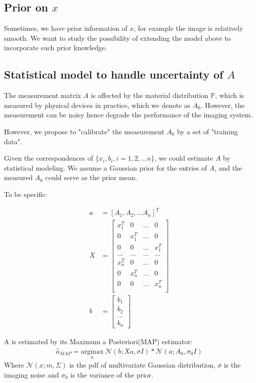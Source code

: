 \documentclass{article} %
\begin{document}
\subsection{Prior on $x$}
Sometimes, we have prior information of $x$, for example the image is relatively smooth. We want to study the possibility of extending the model above to incorporate such prior knowledge.

\subsection{Statistical model to handle uncertainty of $A$}
The measurement matrix $A$ is affected by the material distribution $\mathbb{P}$, which is measured by physical devices in practice, which we denote as $A_0$. However, the measurement can be noisy hence degrade the performance of the imaging system.

However, we propose to "calibrate" the measurement $A_0$ by a set of "training data".

Given the correspondences of  $\{x_i,b_i, i=1,2,...n\}$, we could estimate $A$ by statistical modeling. We assume a Gaussian prior for the entries of $A$, and the measured $A_0$ could serve as the prior mean.

To be specific:

\begin{align}
a&=[A_1,A_2,...A_n]^T\\
X&= \begin{bmatrix}
x_1^T	&	0	&	...	& 0\\
0		&	x_1^T&	...	& 0\\
0		&	0	&	... 	&x_1^T\\
...		&...		&	...	&...\\
x_n^T	&	0	&	...	& 0\\
0		&	x_n^T&	...	& 0\\
0		&	0	&	... 	&x_n^T\\
\end{bmatrix}\\
b&= \begin{bmatrix}
b_1\\
b_2\\
...\\
b_n
\end{bmatrix}
\end{align}

A is estimated by its Maximum a Posteriori(MAP) estimator:
\begin{align}
\hat{a}_{MAP}=  \underset{a} {\mathrm{argmax}} ~ \mathcal{N}(b;X a, \sigma I) * \mathcal{N}(a;A_0,\sigma_0 I)
\end{align}
Where $\mathcal{N}(x;m,\Sigma)$ is the pdf of multivariate Gaussian distribution, $\sigma$ is the imaging noise and $\sigma_0$ is the variance of the prior.
\end{document}
